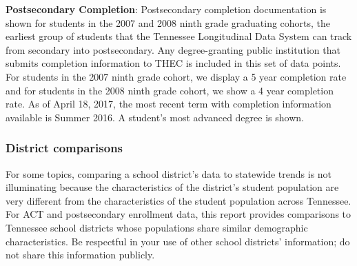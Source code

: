 \documentclass[11pt,]{article}
\begin{document}
\textbf{Postsecondary Completion}: Postsecondary completion
documentation is shown for students in the 2007 and 2008 ninth grade
graduating cohorts, the earliest group of students that the Tennessee
Longitudinal Data System can track from secondary into postsecondary.
Any degree-granting public institution that submits completion
information to THEC is included in this set of data points. For students
in the 2007 ninth grade cohort, we display a 5 year completion rate and
for students in the 2008 ninth grade cohort, we show a 4 year completion
rate. As of April 18, 2017, the most recent term with completion
information available is Summer 2016. A student's most advanced degree
is shown.

\subsubsection{District comparisons}\label{district-comparisons}

For some topics, comparing a school district's data to statewide trends
is not illuminating because the characteristics of the district's
student population are very different from the characteristics of the
student population across Tennessee. For ACT and postsecondary
enrollment data, this report provides comparisons to Tennessee school
districts whose populations share similar demographic characteristics.
Be respectful in your use of other school districts' information; do not
share this information publicly.
\end{document}
